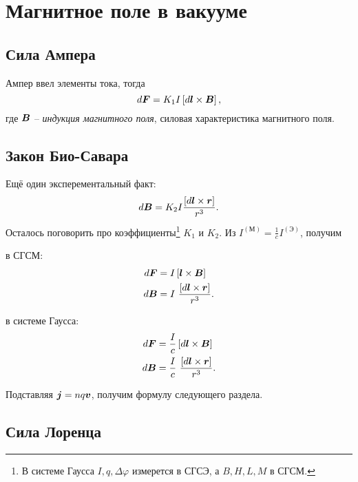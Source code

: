 \section{Магнитное поле в вакууме}

\subsection{Сила Ампера}


Ампер ввел элементы тока, тогда
\begin{equation}
    d \mbox{\boldmath $F$} = K_1 I \left[d \mbox{\boldmath $l$} \times \mbox{\boldmath $B$}\right],
\end{equation}
где $\mbox{\boldmath $B$}$ -- \textit{индукция магнитного поля}, силовая характеристика магнитного поля.


\subsection{Закон Био-Савара}
Ещё один эксперементальный факт:
\begin{equation}
    d \mbox{\boldmath $B$} = K_2 I \frac{\left[d \mbox{\boldmath $l$} \times \mbox{\boldmath $r$}\right]}{r^3} .
\end{equation}
Осталось поговорить про коэффициенты\footnote{
        В системе Гаусса $I, q, \Delta \varphi$ измерется в СГСЭ, а $B, H, L, M$ в СГСМ.
    } $K_1$ и $K_2$. 
Из $I^{(\text{М})} = \frac{1}{c} I^{(\text{Э})}$, получим

\begin{minipage}[t]{0.45\textwidth}
     в СГСМ:
    \begin{align*}
        d \mbox{\boldmath $F$} &= I \left[ \mbox{\boldmath $l$} \times \mbox{\boldmath $B$}\right] \\
        d \mbox{\boldmath $B$} &= I \ \frac{\left[d \mbox{\boldmath $l$} \times \mbox{\boldmath $r$}\right]}{r^3} .
    \end{align*}    
\end{minipage}
\hfill
\begin{minipage}[t]{0.45\textwidth}
    в системе Гаусса:
    \begin{align*}
        d \mbox{\boldmath $F$} &= \frac{I}{c} 
         \left[d \mbox{\boldmath $l$} \times \mbox{\boldmath $B$}\right] \\
        d \mbox{\boldmath $B$} &= \frac{I}{c} 
         \ \frac{\left[d \mbox{\boldmath $l$} \times \mbox{\boldmath $r$}\right]}{r^3} .
    \end{align*}    
\end{minipage}

Подставляя $\mbox{\boldmath $j$} = n q \mbox{\boldmath $v$}$, получим формулу следующего раздела.


\subsection{Сила Лоренца}


